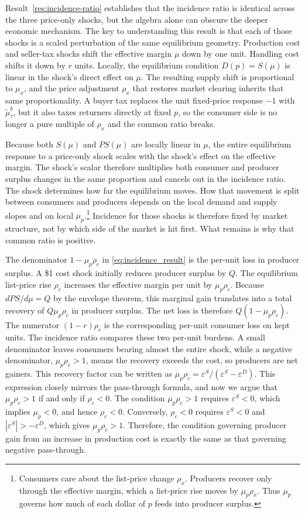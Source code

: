 \documentclass[11pt]{article}
\begin{document}
Result~\ref{res:incidence-ratio} establishes that the incidence ratio is
identical across the three price-only shocks, but the algebra alone can obscure
the deeper economic mechanism.  The key to understanding this result is that
each of those shocks is a scaled perturbation of the same equilibrium
geometry.  Production cost and seller-tax shocks shift the effective margin
$\mu$ down by one unit.  Handling cost shifts it down by $r$ units.  Locally,
the equilibrium condition $D(p)=S(\mu)$ is linear in the shock's direct effect
on $\mu$.  The resulting supply shift is proportional to $\mu_x$, and the price
adjustment $\rho_x$ that restores market clearing inherits that same
proportionality.  A buyer tax replaces the unit fixed-price response
$-1$ with $\tilde{\mu}^{b}_{\tau}$, but it also taxes returners directly at
fixed $p$, so the consumer side is no longer a pure multiple of $\rho_x$
and the common ratio breaks.

Because both $S(\mu)$ and $PS(\mu)$ are locally linear in $\mu$, the entire
equilibrium response to a price-only shock scales with the shock's effect on
the effective margin.  The shock's scalar therefore multiplies both consumer
and producer surplus changes in the same proportion and cancels out in the
incidence ratio.  The shock determines how far the equilibrium moves.  How that
movement is split between consumers and producers depends on the local demand
and supply slopes and on local $\mu_p$.\footnote{Consumers care about the
list-price change $\rho_x$.
Producers recover only through the effective margin, which a list-price rise
moves by $\mu_p\rho_x$.  Thus $\mu_p$ governs how much of each dollar of $p$
feeds into producer surplus.}
Incidence for those shocks is therefore fixed by market structure, not by
which side of the market is hit first.  What remains is why that common ratio
is positive.

The denominator $1-\mu_p\rho_c$ in \eqref{eq:incidence_result} is the per-unit
loss in producer surplus.  A \$1 cost shock initially reduces producer surplus
by $Q$.  The equilibrium list-price rise $\rho_c$ increases the effective
margin per unit by $\mu_p\rho_c$.  Because $dPS/d\mu=Q$ by the envelope
theorem, this marginal gain translates into a total recovery of
$Q\mu_p\rho_c$ in producer surplus.  The net loss is therefore
$Q(1-\mu_p\rho_c)$.  The numerator $(1-r)\rho_c$ is the corresponding
per-unit consumer loss on kept units.  The incidence ratio compares these two
per-unit burdens.  A small denominator leaves consumers
bearing almost the entire shock, while a negative denominator, $\mu_p\rho_c>1$,
means the recovery exceeds the cost, so producers are net gainers.  This
recovery factor can be written as
$\mu_p\rho_c=\varepsilon^S/(\varepsilon^S-\varepsilon^D)$.  This expression
closely mirrors the pass-through formula, and now we argue that
$\mu_p\rho_c>1$ if and only if $\rho_c<0$.  The condition
$\mu_p\rho_c>1$ requires $\varepsilon^S<0$, which implies $\mu_p<0$, and hence
$\rho_c<0$.  Conversely, $\rho_c<0$ requires $\varepsilon^S<0$ and
$|\varepsilon^S|>-\varepsilon^D$, which gives $\mu_p\rho_c>1$.  Therefore, the
condition governing producer gain from an increase in production cost is
exactly the same as that governing negative pass-through.
\end{document}
